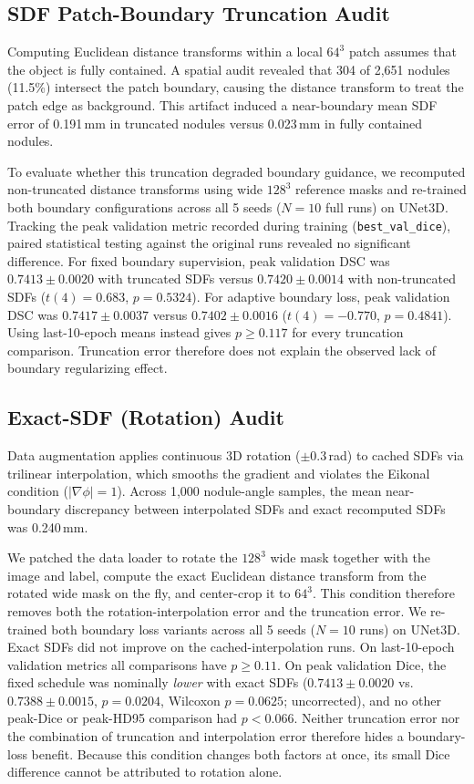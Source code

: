 \documentclass[10pt, a4paper, twocolumn]{article}
\begin{document}
\subsection{SDF Patch-Boundary Truncation Audit}
Computing Euclidean distance transforms within a local $64^3$ patch assumes that the object is fully contained. A spatial audit revealed that 304 of 2,651 nodules (11.5\%) intersect the patch boundary, causing the distance transform to treat the patch edge as background. This artifact induced a near-boundary mean SDF error of 0.191\,mm in truncated nodules versus 0.023\,mm in fully contained nodules.

To evaluate whether this truncation degraded boundary guidance, we recomputed non-truncated distance transforms using wide $128^3$ reference masks and re-trained both boundary configurations across all 5 seeds ($N=10$ full runs) on UNet3D. Tracking the peak validation metric recorded during training (\texttt{best\_val\_dice}), paired statistical testing against the original runs revealed no significant difference. For fixed boundary supervision, peak validation DSC was $0.7413 \pm 0.0020$ with truncated SDFs versus $0.7420 \pm 0.0014$ with non-truncated SDFs ($t(4) = 0.683$, $p = 0.5324$). For adaptive boundary loss, peak validation DSC was $0.7417 \pm 0.0037$ versus $0.7402 \pm 0.0016$ ($t(4) = -0.770$, $p = 0.4841$). Using last-10-epoch means instead gives $p \ge 0.117$ for every truncation comparison. Truncation error therefore does not explain the observed lack of boundary regularizing effect.

\subsection{Exact-SDF (Rotation) Audit}
Data augmentation applies continuous 3D rotation ($\pm0.3$\,rad) to cached SDFs via trilinear interpolation, which smooths the gradient and violates the Eikonal condition ($|\nabla\phi|=1$). Across 1,000 nodule-angle samples, the mean near-boundary discrepancy between interpolated SDFs and exact recomputed SDFs was 0.240\,mm.

We patched the data loader to rotate the $128^3$ wide mask together with the image and label, compute the exact Euclidean distance transform from the rotated wide mask on the fly, and center-crop it to $64^3$. This condition therefore removes both the rotation-interpolation error and the truncation error. We re-trained both boundary loss variants across all 5 seeds ($N=10$ runs) on UNet3D. Exact SDFs did not improve on the cached-interpolation runs. On last-10-epoch validation metrics all comparisons have $p \ge 0.11$. On peak validation Dice, the fixed schedule was nominally \emph{lower} with exact SDFs ($0.7413 \pm 0.0020$ vs.\ $0.7388 \pm 0.0015$, $p = 0.0204$, Wilcoxon $p = 0.0625$; uncorrected), and no other peak-Dice or peak-HD95 comparison had $p < 0.066$. Neither truncation error nor the combination of truncation and interpolation error therefore hides a boundary-loss benefit. Because this condition changes both factors at once, its small Dice difference cannot be attributed to rotation alone.
\end{document}
